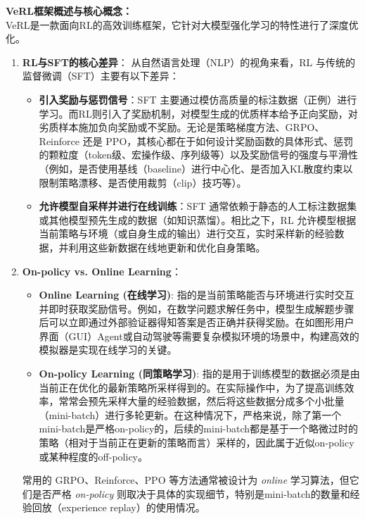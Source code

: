 \documentclass{article}
\begin{document}
\textbf{VeRL框架概述与核心概念：} \\
VeRL是一款面向RL的高效训练框架，它针对大模型强化学习的特性进行了深度优化。
\begin{enumerate}
    \item \textbf{RL与SFT的核心差异}：
    从自然语言处理（NLP）的视角来看，RL 与传统的监督微调（SFT）主要有以下差异：
    \begin{itemize}
        \item \textbf{引入奖励与惩罚信号}：SFT 主要通过模仿高质量的标注数据（正例）进行学习。而RL则引入了奖励机制，对模型生成的优质样本给予正向奖励，对劣质样本施加负向奖励或不奖励。无论是策略梯度方法、GRPO、Reinforce 还是 PPO，其核心都在于如何设计奖励函数的具体形式、惩罚的颗粒度（token级、宏操作级、序列级等）以及奖励信号的强度与平滑性（例如，是否使用基线（baseline）进行中心化、是否加入KL散度约束以限制策略漂移、是否使用裁剪（clip）技巧等）。
        \item \textbf{允许模型自采样并进行在线训练}：SFT 通常依赖于静态的人工标注数据集或其他模型预先生成的数据（如知识蒸馏）。相比之下，RL 允许模型根据当前策略与环境（或自身生成的输出）进行交互，实时采样新的经验数据，并利用这些新数据在线地更新和优化自身策略。
    \end{itemize}

    \item \textbf{On-policy vs. Online Learning}：
    \begin{itemize}
        \item \textbf{Online Learning (在线学习)}: 指的是当前策略能否与环境进行实时交互并即时获取奖励信号。例如，在数学问题求解任务中，模型生成解题步骤后可以立即通过外部验证器得知答案是否正确并获得奖励。在如图形用户界面（GUI）Agent或自动驾驶等需要复杂模拟环境的场景中，构建高效的模拟器是实现在线学习的关键。
        \item \textbf{On-policy Learning (同策略学习)}: 指的是用于训练模型的数据必须是由当前正在优化的最新策略所采样得到的。在实际操作中，为了提高训练效率，常常会预先采样大量的经验数据，然后将这些数据分成多个小批量（mini-batch）进行多轮更新。在这种情况下，严格来说，除了第一个mini-batch是严格on-policy的，后续的mini-batch都是基于一个略微过时的策略（相对于当前正在更新的策略而言）采样的，因此属于近似on-policy或某种程度的off-policy。
    \end{itemize}
    常用的 GRPO、Reinforce、PPO 等方法通常被设计为 \emph{online} 学习算法，但它们是否严格 \emph{on-policy} 则取决于具体的实现细节，特别是mini-batch的数量和经验回放（experience replay）的使用情况。


\end{enumerate}
\end{document}
